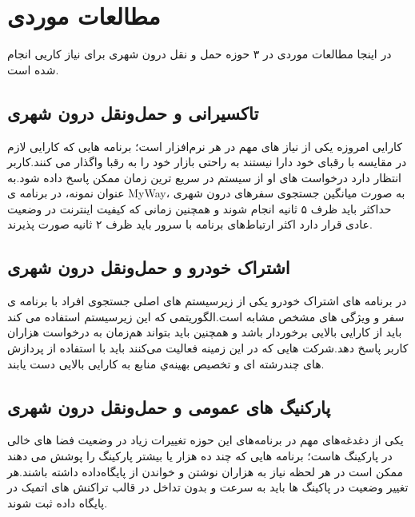 \section{مطالعات موردی}

در اینجا مطالعات موردی در ۳ حوزه حمل و نقل درون شهری برای نیاز کاریی انجام شده است. 
\subsection{تاکسیرانی و حمل‌و‌نقل درون شهری}
کارایی امروزه یکی از نیاز های مهم در هر نرم‌افزار است؛ برنامه هایی که کارایی لازم در مقایسه با رقبای خود دارا نیستند به راحتی بازار خود را به رقبا واگذار می کنند.کاربر انتظار دارد درخواست های او از سیستم در سریع ترین زمان ممکن پاسخ داده شود.به عنوان نمونه، در برنامه ی MyWay، به صورت میانگین جستجوی سفرهای درون شهری حداکثر باید ظرف ۵ ثانیه انجام شوند و همچنین زمانی که کیفیت اینترنت در وضعیت عادی قرار دارد اکثر ارتباط‌های برنامه با سرور باید ظرف ۲ ثانیه صورت پذیرند.
\subsection{اشتراک خودرو و حمل‌و‌نقل درون شهری}
در برنامه های اشتراک خودرو یکی از زیرسیستم های اصلی جستجوی افراد با برنامه ی سفر و ویژگی های مشخص مشابه است.الگوریتمی که این زیرسیستم استفاده می کند باید از کارایی بالایی برخوردار باشد و همچنین باید بتواند هم‌زمان به درخواست هزاران کاربر پاسخ دهد.شرکت هایی که در این زمینه فعالیت می‌کنند باید با استفاده از پردازش های چندرشته ای و تخصیص بهینه‌ي منابع به کارایی بالایی دست یابند.
\subsection{پارکنیگ های عمومی و حمل‌و‌نقل درون شهری}
یکی از دغدغه‌های مهم در برنامه‌های این حوزه تغییرات زیاد در وضعیت فضا های خالی در پارکینگ هاست؛ برنامه هایی که چند ده هزار یا بیشتر پارکینگ را پوشش می دهند ممکن است در هر لحظه نیاز به هزاران نوشتن و خواندن از پایگاه‌داده داشته باشند.هر تغییر وضعیت در پاکینگ ها باید به سرعت و بدون تداخل در قالب تراکنش های اتمیک در پایگاه داده ثبت شوند.



